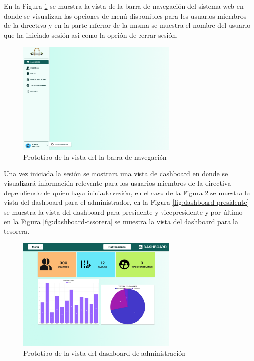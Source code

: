 En la Figura \ref{fig:nevagacion} se muestra la vista de la barra de navegación del sistema web en donde se visualizan las opciones de menú disponibles para los usuarios miembros de la directiva y en la parte inferior de la misma se muestra el nombre del usuario que ha iniciado sesión asi como la opción de cerrar sesión.

\begin{figure}[H]
    \centering
    \includegraphics[width=0.7\textwidth]{resources/images/navegacion}
    \caption{Prototipo de la vista del la barra de navegación}
    \label{fig:nevagacion}
\end{figure}


Una vez iniciada la sesión se mostrara una vista de dashboard en donde se visualizará información relevante para los usuarios miembros de la directiva dependiendo de quien haya iniciado sesión, en el caso de la Figura \ref{fig:dashboard} se muestra la vista del dashboard para el administrador, en la Figura \ref{fig:dashboard-presidente} se muestra la vista del dashboard para presidente y vicepresidente y por último en la Figura \ref{fig:dashboard-tesorera} se muestra la vista del dashboard para la tesorera.

\begin{figure}[H]
    \centering
    \includegraphics[width=0.7\textwidth]{resources/images/dashboard}
    \caption{Prototipo de la vista del dashboard de administración}
    \label{fig:dashboard}
\end{figure}

